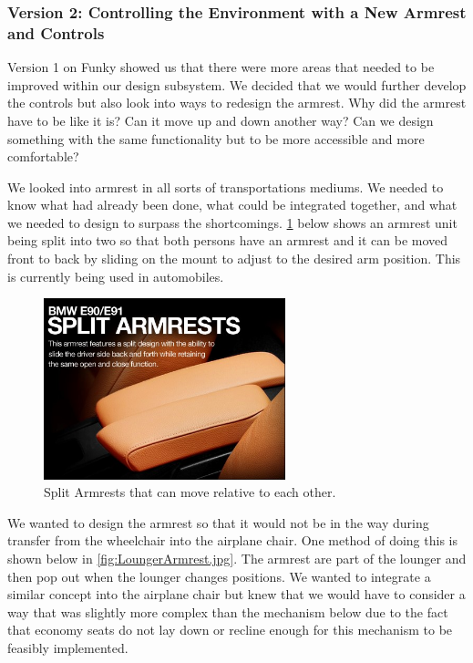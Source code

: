 \subsubsection*{Version 2: Controlling the Environment with a New Armrest and Controls}

Version 1 on Funky showed us that there were more areas that needed to be improved within our design subsystem.  We decided that we would further develop the controls but also look into ways to redesign the armrest.  Why did the armrest have to be like it is? Can it move up and down another way? Can we design something with the same functionality but to be more accessible and more comfortable?

We looked into armrest in all sorts of transportations mediums. We needed to know what had already been done, what could be integrated together, and what we needed to design to surpass the shortcomings.   \ref{fig:SplitArmrests.jpg} below shows an armrest unit being split into two so that both persons have an armrest and it can be moved front to back by sliding on the mount to adjust to the desired arm position. This is currently being used in automobiles.


\begin{figure}[h]
  \centering
     \includegraphics[width=7cm]{images/SplitArmrests.jpg}
   \caption{Split Armrests that can move relative to each other.\cite{splitarmrest} }
  \label{fig:SplitArmrests.jpg}
\end{figure}

We wanted to design the armrest so that it would not be in the way during transfer from the wheelchair into the airplane chair.  One method of doing this is shown below in  \ref{fig:LoungerArmrest.jpg}.  The armrest are part of the lounger and then pop out when the lounger changes positions.  We wanted to integrate a similar concept into the airplane chair but knew that we would have to consider a way that was slightly more complex than the mechanism below due to the fact that economy seats do not lay down or recline enough for this mechanism to be feasibly implemented. 



